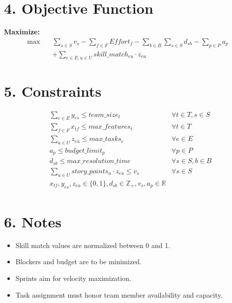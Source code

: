 \documentclass{article}
\begin{document}
\section*{4. Objective Function}
\textbf{Maximize:}
\begin{align*}
\max \quad & \sum_{s \in S} v_s - \sum_{f \in F} Effort_f - \sum_{b \in B} \sum_{s \in S} d_{sb} - \sum_{p \in P} a_p \\
& + \sum_{e \in E, u \in U} skill\_match_{eu} \cdot z_{eu}
\end{align*}

\section*{5. Constraints}
\begin{align*}
& \sum_{e \in E} y_{es} \leq team\_size_t & \forall t \in T, s \in S \\
& \sum_{f \in F} x_{tf} \leq max\_features_t & \forall t \in T \\
& \sum_{u \in U} z_{eu} \leq max\_tasks_e & \forall e \in E \\
& a_p \leq budget\_limit_p & \forall p \in P \\
& d_{sb} \leq max\_resolution\_time & \forall s \in S, b \in B \\
& \sum_{u \in U} story\_points_u \cdot z_{eu} \leq v_s & \forall s \in S \\
& x_{tf}, y_{es}, z_{eu} \in \{0,1\}, d_{sb} \in \mathbb{Z}_{+}, v_s, a_p \in \mathbb{R} \\
\end{align*}

\section*{6. Notes}
\begin{itemize}
\item Skill match values are normalized between 0 and 1.
\item Blockers and budget are to be minimized.
\item Sprints aim for velocity maximization.
\item Task assignment must honor team member availability and capacity.
\end{itemize}
\end{document}
